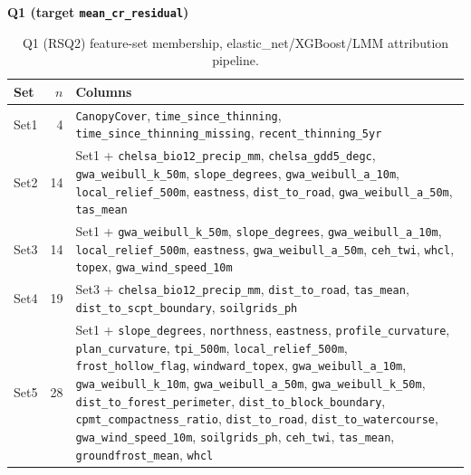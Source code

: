 \begin{table}[H]
\centering
\textbf{Q1 (target \texttt{mean\_cr\_residual})}\\[4pt]
\scriptsize
\renewcommand{\arraystretch}{1.1}
\begin{tabularx}{\linewidth}{@{} l r >{\raggedright\arraybackslash}X @{}}
\toprule
Set & $n$ & Columns \\
\midrule
Set1 & 4 & \texttt{CanopyCover}, \texttt{time\_since\_thinning}, \texttt{time\_since\_thinning\_missing}, \texttt{recent\_thinning\_5yr} \\
Set2 & 14 & Set1 + \texttt{chelsa\_bio12\_precip\_mm}, \texttt{chelsa\_gdd5\_degc}, \texttt{gwa\_weibull\_k\_50m}, \texttt{slope\_degrees}, \texttt{gwa\_weibull\_a\_10m}, \texttt{local\_relief\_500m}, \texttt{eastness}, \texttt{dist\_to\_road}, \texttt{gwa\_weibull\_a\_50m}, \texttt{tas\_mean} \\
Set3 & 14 & Set1 + \texttt{gwa\_weibull\_k\_50m}, \texttt{slope\_degrees}, \texttt{gwa\_weibull\_a\_10m}, \texttt{local\_relief\_500m}, \texttt{eastness}, \texttt{gwa\_weibull\_a\_50m}, \texttt{ceh\_twi}, \texttt{whcl}, \texttt{topex}, \texttt{gwa\_wind\_speed\_10m} \\
Set4 & 19 & Set3 + \texttt{chelsa\_bio12\_precip\_mm}, \texttt{dist\_to\_road}, \texttt{tas\_mean}, \texttt{dist\_to\_scpt\_boundary}, \texttt{soilgrids\_ph} \\
Set5 & 28 & Set1 + \texttt{slope\_degrees}, \texttt{northness}, \texttt{eastness}, \texttt{profile\_curvature}, \texttt{plan\_curvature}, \texttt{tpi\_500m}, \texttt{local\_relief\_500m}, \texttt{frost\_hollow\_flag}, \texttt{windward\_topex}, \texttt{gwa\_weibull\_a\_10m}, \texttt{gwa\_weibull\_k\_10m}, \texttt{gwa\_weibull\_a\_50m}, \texttt{gwa\_weibull\_k\_50m}, \texttt{dist\_to\_forest\_perimeter}, \texttt{dist\_to\_block\_boundary}, \texttt{cpmt\_compactness\_ratio}, \texttt{dist\_to\_road}, \texttt{dist\_to\_watercourse}, \texttt{gwa\_wind\_speed\_10m}, \texttt{soilgrids\_ph}, \texttt{ceh\_twi}, \texttt{tas\_mean}, \texttt{groundfrost\_mean}, \texttt{whcl} \\
\bottomrule
\end{tabularx}
\caption{\small{Q1 (RSQ2) feature-set membership, elastic\_net/XGBoost/LMM attribution pipeline.}}
\label{tab:feature-sets-q1}
\end{table}

